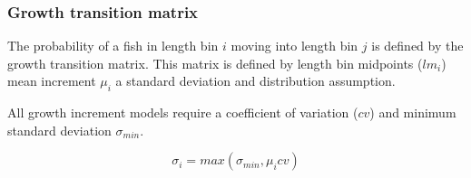 %
%

\subsubsection{Growth transition matrix}\label{sec:GrowthIncrement-GrowthMatrix}

The probability of a fish in length bin \(i\) moving into length bin \(j\) is defined by the growth transition matrix. This matrix is defined by length bin midpoints (\(lm_i\)) mean increment \(\mu_i\) a standard deviation and distribution assumption.

All growth increment models require a coefficient of variation (\(cv\)) and minimum standard deviation \(\sigma_{min}\). 

\[
\sigma_i = max(\sigma_{min}, \mu_i cv)
\]

